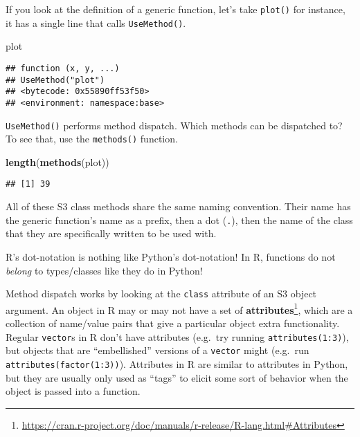 \documentclass[12pt,krantz2]{krantz}
\makeatletter
\newenvironment{Shaded}{\begin{snugshade}}{\end{snugshade}}
\newcommand{\KeywordTok}[1]{\textcolor[rgb]{0.27,0.27,0.27}{\textbf{#1}}}
\newcommand{\NormalTok}[1]{#1}
\renewcommand{\href}[2]{#2\footnote{\url{#1}}}
\newenvironment{kframe}{%
\medskip{}
\setlength{\fboxsep}{.8em}
 \def\at@end@of@kframe{}%
 \ifinner\ifhmode%
  \def\at@end@of@kframe{\end{minipage}}%
  \begin{minipage}{\columnwidth}%
 \fi\fi%
 \def\FrameCommand##1{\hskip\@totalleftmargin \hskip-\fboxsep
 \colorbox{shadecolor}{##1}\hskip-\fboxsep
     \hskip-\linewidth \hskip-\@totalleftmargin \hskip\columnwidth}%
 \MakeFramed {\advance\hsize-\width
   \@totalleftmargin\z@ \linewidth\hsize
   \@setminipage}}%
 {\par\unskip\endMakeFramed%
 \at@end@of@kframe}
\renewenvironment{Shaded}{\begin{kframe}}{\end{kframe}}
\makeatother
\begin{document}
If you look at the definition of a generic function, let's take \texttt{plot()} for instance, it has a single line that calls \texttt{UseMethod()}.

\begin{Shaded}
\begin{Highlighting}[]
\NormalTok{plot}
\end{Highlighting}
\end{Shaded}

\begin{verbatim}
## function (x, y, ...) 
## UseMethod("plot")
## <bytecode: 0x55890ff53f50>
## <environment: namespace:base>
\end{verbatim}

\texttt{UseMethod()} performs method dispatch. Which methods can be dispatched to? To see that, use the \texttt{methods()} function.

\begin{Shaded}
\begin{Highlighting}[]
\KeywordTok{length}\NormalTok{(}\KeywordTok{methods}\NormalTok{(plot))}
\end{Highlighting}
\end{Shaded}

\begin{verbatim}
## [1] 39
\end{verbatim}

All of these S3 class methods share the same naming convention. Their name has the generic function's name as a prefix, then a dot (\texttt{.}), then the name of the class that they are specifically written to be used with.

\begin{rmd-caution}
R's dot-notation is nothing like Python's dot-notation! In R, functions do not \emph{belong} to types/classes like they do in Python!

\end{rmd-caution}

Method dispatch works by looking at the \texttt{class} attribute of an S3 object argument. An object in R may or may not have a set of \href{https://cran.r-project.org/doc/manuals/r-release/R-lang.html\#Attributes}{\textbf{attributes}}, which are a collection of name/value pairs that give a particular object extra functionality. Regular \texttt{vector}s in R don't have attributes (e.g.~try running \texttt{attributes(1:3)}), but objects that are ``embellished'' versions of a \texttt{vector} might (e.g.~run \texttt{attributes(factor(1:3))}). Attributes in R are similar to attributes in Python, but they are usually only used as ``tags'' to elicit some sort of behavior when the object is passed into a function.
\end{document}
